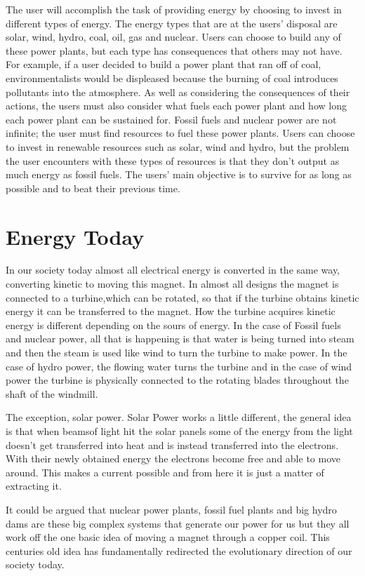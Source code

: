\documentclass[msc,oneside]{ubcthesis}%
\begin{document}
The user will accomplish the task of providing energy by choosing to invest in different types of energy. 
The energy types that are at the users' disposal are solar, wind, hydro, coal, oil, gas and nuclear. Users 
can choose to build any of these power plants, but each type has consequences that others may not have. For 
example, if a user decided to build a power plant that ran off of coal, environmentalists would be 
displeased because the burning of coal introduces pollutants into the atmosphere. As well as considering 
the consequences of their actions, the users must also consider what fuels each power plant and how long 
each power plant can be sustained for. Fossil fuels and nuclear power are not infinite; the user must find 
resources to fuel these power plants. Users can choose to invest in renewable resources such as solar, wind 
and hydro, but the problem the user encounters with these types of resources is that they don't output as 
much energy as fossil fuels. The users' main objective is to survive for as long as possible and to beat 
their previous time. 

\chapter{Energy Today}
	In our society today almost all electrical energy is converted in the same way, converting kinetic 	
to moving this magnet. In almost all designs the magnet is connected to a turbine,which can be rotated, so 
that if the turbine obtains kinetic energy it can be transferred to the magnet. How the turbine acquires 
kinetic energy is different depending on the sours of energy. In the case of Fossil fuels and nuclear 
power, all that is happening is that water is being turned into steam and then the steam is used like wind 
to turn the turbine to make power. In the case of hydro power, the flowing water turns the turbine and in 
the case of wind power the turbine is physically connected to the rotating blades throughout the shaft of 
the windmill. 
\bigskip

The exception, solar power. Solar Power works a little different, the general idea is that when beamsof 
light hit the solar panels some of the energy from the light doesn’t get transferred into heat and is 
instead transferred into the electrons. With their newly obtained energy the electrons become free and able 
to move around. This makes a current possible and from here it is just a matter of extracting it.
\bigskip

It could be argued that nuclear power plants, fossil fuel plants and big hydro dams are these big complex 
systems that generate our power for us but they all work off the one basic idea of moving a magnet through 
a copper coil. This centuries old idea has fundamentally redirected the evolutionary direction of our 
society today. 
\end{document}
